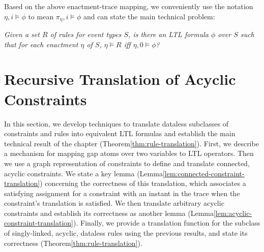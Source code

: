 Based on the above enactment-trace mapping,
we conveniently use the notation $\eta,i \models \phi$
to mean $\pi_{\eta},i\models\phi$ and
can state the main technical problem:
  
{\em
  Given a set $R$ of rules for event types $S$,
  is there an LTL formula $\phi$ over $S$ such that
  for each enactment $\eta$ of $S$,
  $\eta\models R$ iff $\eta,0\models \phi$?
}

\section{Recursive Translation of Acyclic Constraints}
\label{sec:mapping}
  
In this section,
we develop techniques to translate dataless subclasses of constraints and rules
into equivalent LTL formulas
and
establish the main technical result of the chapter (Theorem\:\ref{thm:rule-translation}).
First, we describe a mechanism for mapping
gap atoms over two variables to LTL operators.
Then we use a graph representation of constraints
to define and translate connected, acyclic constraints.
We state a key lemma
(Lemma\:\ref{lem:connected-constraint-translation})
concerning the correctness of this translation,
which associates
a satisfying assignment for a constraint
with an instant in the trace when
the constraint's translation is satisfied.
We then translate arbitrary acyclic constraints
and establish its correctness as another lemma
(Lemma\:\ref{lem:acyclic-constraint-translation}).
Finally, we provide a translation function for
the subclass of singly-linked, acyclic, dataless rules
using the previous results,
and
state its correctness (Theorem\:\ref{thm:rule-translation}).

